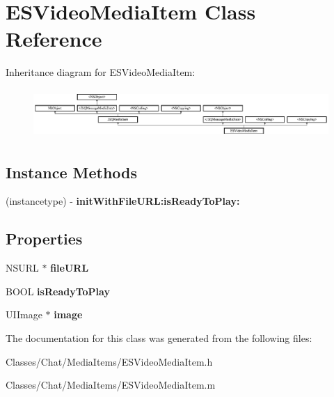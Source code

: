 \hypertarget{interface_e_s_video_media_item}{}\section{E\+S\+Video\+Media\+Item Class Reference}
\label{interface_e_s_video_media_item}
Inheritance diagram for E\+S\+Video\+Media\+Item\+:\begin{figure}[H]
\begin{center}
\leavevmode
\includegraphics[height=1.871345cm]{interface_e_s_video_media_item}
\end{center}
\end{figure}
\subsection*{Instance Methods}
\begin{DoxyCompactItemize}
\item 
\hypertarget{interface_e_s_video_media_item_a2d0d5814b76bc7b580aa5b710ddd592e}{}(instancetype) -\/ {\bfseries init\+With\+File\+U\+R\+L\+:is\+Ready\+To\+Play\+:}\label{interface_e_s_video_media_item_a2d0d5814b76bc7b580aa5b710ddd592e}

\end{DoxyCompactItemize}
\subsection*{Properties}
\begin{DoxyCompactItemize}
\item 
\hypertarget{interface_e_s_video_media_item_ad2fc8dfaf6193f3bd1aedb305d51eafc}{}N\+S\+U\+R\+L $\ast$ {\bfseries file\+U\+R\+L}\label{interface_e_s_video_media_item_ad2fc8dfaf6193f3bd1aedb305d51eafc}

\item 
\hypertarget{interface_e_s_video_media_item_a387fa06c5419e4c74ce24a7b2460ffd7}{}B\+O\+O\+L {\bfseries is\+Ready\+To\+Play}\label{interface_e_s_video_media_item_a387fa06c5419e4c74ce24a7b2460ffd7}

\item 
\hypertarget{interface_e_s_video_media_item_a9a7935eed7dfed0d9085af99c8dd0e46}{}U\+I\+Image $\ast$ {\bfseries image}\label{interface_e_s_video_media_item_a9a7935eed7dfed0d9085af99c8dd0e46}

\end{DoxyCompactItemize}


The documentation for this class was generated from the following files\+:\begin{DoxyCompactItemize}
\item 
Classes/\+Chat/\+Media\+Items/E\+S\+Video\+Media\+Item.\+h\item 
Classes/\+Chat/\+Media\+Items/E\+S\+Video\+Media\+Item.\+m\end{DoxyCompactItemize}

